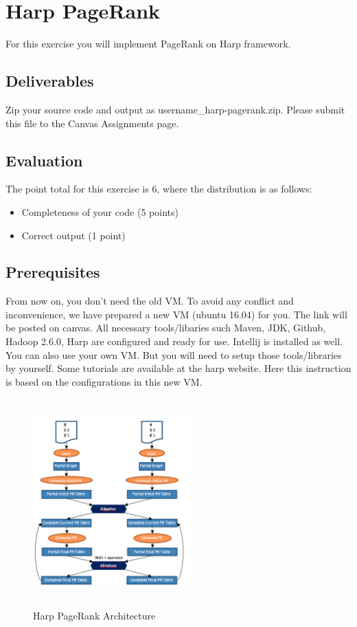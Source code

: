 \section*{Harp PageRank}

For this exercise you will implement PageRank on Harp framework.

\subsection*{Deliverables}
Zip your source code and output as username\_harp-pagerank.zip. Please submit
this file to the Canvas Assignments page.

\subsection*{Evaluation}
The point total for this exercise is 6, where the distribution is as follows:


\begin{itemize}
\item Completeness of your code (5 points)
\item Correct output (1 point)
\end{itemize}

\subsection*{Prerequisites}
From now on, you don't need the old VM. To avoid any conflict and
inconvenience, we have prepared a new VM (ubuntu 16.04) for you. The link will
be posted on canvas. All necessary tools/libaries such Maven, JDK, Github,
Hadoop 2.6.0, Harp are configured and ready for use. Intellij is installed as
well. You can also use your own VM. But you will need to setup those
tools/libraries by yourself. Some tutorials are available at the harp
website. Here this instruction is based on the configurations in
this new VM.

\begin{figure}[!htbp]
\includegraphics[width=6cm,height=8cm]{section/icloud/assignment/exercise7/p8}
\centering
\caption{Harp PageRank Architecture}
\end{figure}

